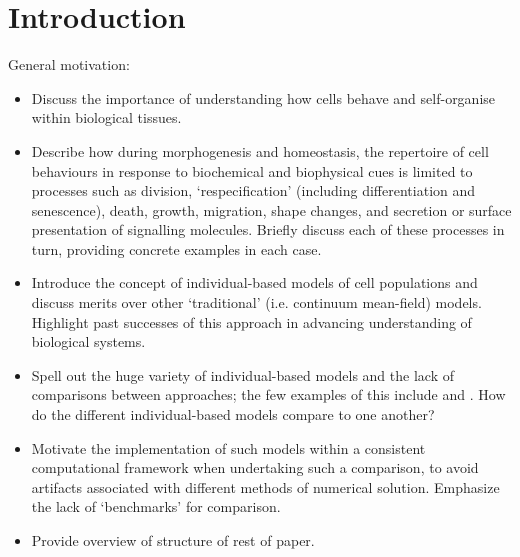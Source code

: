 \documentclass{article}
\begin{document}

\section{Introduction} \label{sec:intro}

General motivation:
\begin{itemize}
\item Discuss the importance of understanding how cells behave and self-organise within biological tissues.
\item Describe how during morphogenesis and homeostasis, the repertoire of cell behaviours in response to biochemical and biophysical cues is limited to processes such as division, `respecification' (including differentiation and senescence), death, growth, migration, shape changes, and secretion or surface presentation of signalling molecules. Briefly discuss each of these processes in turn, providing concrete examples in each case.
\item Introduce the concept of individual-based models of cell populations and discuss merits over other `traditional' (i.e. continuum mean-field) models. Highlight past successes of this approach in advancing understanding of biological systems.
\item Spell out the huge variety of individual-based models and the lack of comparisons between approaches; the few examples of this include \citet{Galle2006Individual} and \citet{Osborne2010Hybrid}. How do the different individual-based models compare to one another?
\item Motivate the implementation of such models within a consistent computational framework when undertaking such a comparison, to avoid artifacts associated with different methods of numerical solution. Emphasize the lack of `benchmarks' for comparison.
\item Provide overview of structure of rest of paper.
\end{itemize}

\end{document}
